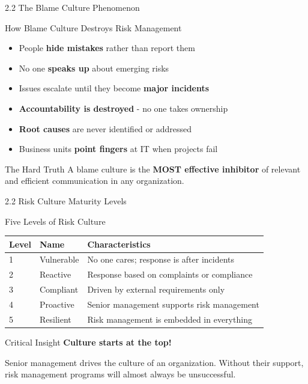 \documentclass[10pt]{beamer}  %
\begin{document}
	\begin{frame}{2.2 The Blame Culture Phenomenon}
		\begin{block}{How Blame Culture Destroys Risk Management}
			\begin{itemize}
				\item People \textbf{hide mistakes} rather than report them
				\item No one \textbf{speaks up} about emerging risks
				\item Issues escalate until they become \textbf{major incidents}
				\item \textbf{Accountability is destroyed} - no one takes ownership
				\item \textbf{Root causes} are never identified or addressed
				\item Business units \textbf{point fingers} at IT when projects fail
			\end{itemize}
		\end{block}
		
		\begin{alertblock}{The Hard Truth}
			A blame culture is the \textbf{MOST effective inhibitor} of relevant and efficient communication in any organization.
		\end{alertblock}
	\end{frame}
	
	\begin{frame}{2.2 Risk Culture Maturity Levels}
		\begin{block}{Five Levels of Risk Culture}
			\begin{tabular}{|p{2cm}|p{3.5cm}|p{5.5cm}|}
				\hline
				\textbf{Level} & \textbf{Name} & \textbf{Characteristics} \\
				\hline
				1 & Vulnerable & No one cares; response is after incidents \\
				\hline
				2 & Reactive & Response based on complaints or compliance \\
				\hline
				3 & Compliant & Driven by external requirements only \\
				\hline
				4 & Proactive & Senior management supports risk management \\
				\hline
				5 & Resilient & Risk management is embedded in everything \\
				\hline
			\end{tabular}
		\end{block}
		
		\begin{exampleblock}{Critical Insight}
			\centering
			\Large{\textbf{Culture starts at the top!}}
			
			\normalsize{Senior management drives the culture of an organization. Without their support, risk management programs will almost always be unsuccessful.}
		\end{exampleblock}
	\end{frame}
	
\end{document}
